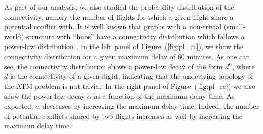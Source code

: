 As part of our analysis, we also studied the probability
distribution of the connectivity, namely the number of flights
for which a given flight share a potential conflict with. It is well known that
graphs with a non-trivial (small-world) structure with ``hubs'' have a
connectivity distribution which follows a power-law distribution
\cite{barabasi:99}. In the left panel of Figure~(\ref{fig:pl_cc}), we show the
connectivity distribution for a given maximum delay of $60$ minutes. As one can
see, the connectivity distribution shows a power-law decay of the form
$d^\alpha$, where $d$ is the connectivity of a given flight, indicating that 
the underlying topology of the ATM problem is not trivial. In the right panel of
Figure~(\ref{fig:pl_cc}) we also show the power-law decay $\alpha$ as a function
of the maximum delay time. As expected, $\alpha$ decreases by increasing the
maximum delay time. Indeed, the number of potential conflicts shared by two flights
increases as well by increasing the maximum delay time.\\

